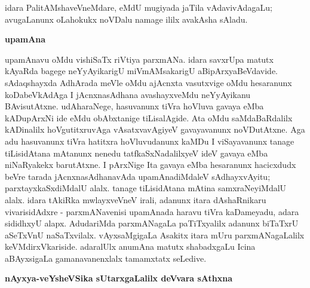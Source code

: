 idara PalitAMshaveVneMdare, eMdU mugiyada jaTila vAdavivAdagaLu; avugaLanunx oLa\-hokukx noVDalu namage ililx avakAsha sAladu.

\newpage

\begin{center}
{\Large\bf upamAna}
\end{center}

upamAnavu oMdu vishiSaTx riVtiya parxmANa. idara savxrUpa matutx kAyaRda bagege neYyAyikarigU miVmAMsakarigU aBipArxyaBeVdavide. sAdaqshayxda AdhArada meVle oMdu ajAcnxta vasutxvige oMdu hesaranunx koDabeVkAdAga I jAcnxnasAdhana avashayxveMdu neYyAyikanu BAvisutAtxne. udAharaNege, hasuvanunx tiVra hoVluva gavaya eMba kADupArxNi ide eMdu obAbxtanige tiLisalAgide. Ata oMdu saMdaBaRdalilx kADinalilx hoVgutitxruvAga vAsatxvavAgiyeV gavayavanunx noVDutAtxne. Aga adu hasuvanunx tiVra hatitxra hoVluvudanunx kaMDu I viSayavanunx tanage tiLisidAtana mAtanunx nenedu tatfkaSxNadalilxyeV ideV gavaya eMba niNaRyakekx barutAtxne. I pArxNige Ita gavaya eMba hesaranunx hacicxdudx beVre tarada jAcnxnasAdhanavAda upamAnadiMdaleV sAdhayxvAyitu; parxtayxkaSxdiMdalU alalx. tanage tiLisidAtana mAtina samxraNeyiMdalU alalx. idara tAkiRka mwlayxveVneV irali, adanunx itara dAshaRnikaru vivarisidAdxre - parxmANavenisi upamAnada haravu tiVra kaDameyadu, adara sididhxyU alapx. AdudariMda parxmANagaLa paTiTxyalilx adanunx biTaTxrU aSeTxVnU naSaTxvilalx. vAyxsaMgigaLa Asakitx itara mUru parxmANagaLalilx keVMdirxVkariside. adaralUlx anumAna matutx shabadxgaLu Icina aBAyxsigaLa gamanavanenxlalx tamamxtatx seLedive.

\smallskip
\begin{center}
{\Large\bf nAyxya-veYsheVSika sUtarxgaLalilx deVvara sAthxna}
\end{center}

